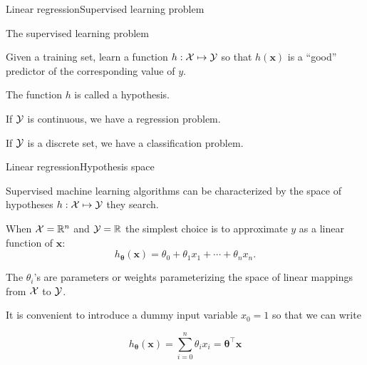 \documentclass{beamer}
\renewcommand{\vec}[1]{\boldsymbol{#1}}
\def\Rset{\mathbb{R}}
\begin{document}
\begin{frame}{Linear regression}{Supervised learning problem}

  \begin{block}{The supervised learning problem}

    Given a training set, learn a function $h : {\cal X} \mapsto {\cal Y}$
    so that $h(\vec{x})$ is a ``good'' predictor of the corresponding value
    of $y$.
    
  \end{block}

  \medskip

  The function $h$ is called a \alert{hypothesis}.

  \medskip

  If $\cal Y$ is continuous, we have a \alert{regression} problem.

  \medskip

  If $\cal Y$ is a discrete set, we have a \alert{classification}
  problem.

\end{frame}


\begin{frame}{Linear regression}{Hypothesis space}

  Supervised machine learning algorithms can be characterized by the
  space of hypotheses $h : {\cal X} \mapsto {\cal Y}$ they search.

  \medskip

  When ${\cal X} = \Rset^n$ and ${\cal Y} = \Rset$ the simplest choice
  is to approximate $y$ as a linear function of $\vec{x}$:
  \[ h_{\vec{\theta}}(\vec{x}) = \theta_0 + \theta_1 x_1 + \cdots + \theta_n x_n .\]

  \medskip

  The $\theta_i$'s are \alert{parameters} or \alert{weights}
  parameterizing the space of linear mappings from $\cal X$ to $\cal
  Y$.

  \medskip

  It is convenient to introduce a dummy input variable $x_0=1$ so that
  we can write

  \[ h_{\vec{\theta}}(\vec{x}) = \sum_{i=0}^n \theta_i x_i = \vec{\theta}^\top \vec{x} \]
  
\end{frame}
\end{document}
